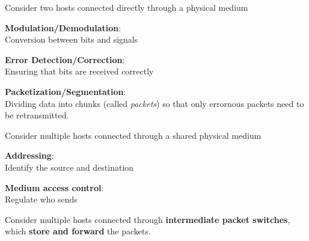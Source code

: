 \begin{frame}[t]\normalsize
	Consider two hosts connected directly through a physical medium
\end{frame}

\begin{frame} \begin{center} \large
	\textbf{Modulation/Demodulation}:\\ Conversion between bits and signals\\
\end{center} \end{frame}

\begin{frame} \begin{center} \large
	\textbf{Error Detection/Correction}:\\ Ensuring that bits are received correctly\\
\end{center} \end{frame}

\begin{frame}\begin{center}\large
	\textbf{Packetization/Segmentation}:\\ \large Dividing data into chunks (called \textit{packets}) 
	so that only errornous packets need to be retransmitted.
\end{center}\end{frame}

\begin{frame}[t]\normalsize
	Consider multiple hosts connected through a shared physical medium
\end{frame}

\begin{frame}\begin{center}\large
	\textbf{Addressing}:\\ Identify the source and destination
\end{center}\end{frame}

\begin{frame}\begin{center}\large
	\textbf{Medium access control}:\\ Regulate who sends
\end{center}\end{frame}

\begin{frame}[t]\normalsize
	Consider multiple hosts connected through \textbf{intermediate packet switches}, 
	which \textbf{store and forward} the packets.
\end{frame}

